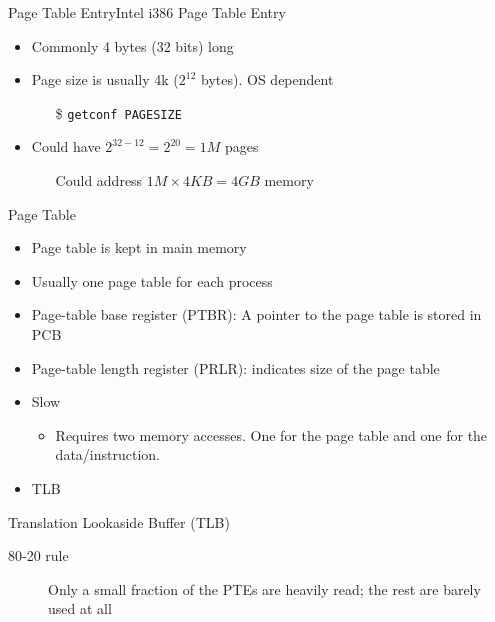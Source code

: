 \begin{frame}{Page Table Entry}{Intel i386 Page Table Entry}
  \begin{itemize}
  \item Commonly 4 bytes (32 bits) long
  \item Page size is usually 4k ($2^{12}$ bytes). OS dependent
    \begin{itemize}
    \item[\$] \texttt{getconf PAGESIZE}
    \end{itemize}
  \item Could have $2^{32-12}=2^{20}=1M$ pages
    \begin{itemize}
    \item[] Could address $1M\times{}4KB=4GB$ memory
    \end{itemize}
  \end{itemize}
  \centering
\end{frame}

\begin{frame}{Page Table}
  \begin{itemize}
  \item Page table is kept in main memory
  \item Usually one page table for each process
  \item \alert{Page-table base register (PTBR):} A pointer to the page table is stored in
    PCB
  \item \alert{Page-table length register (PRLR):} indicates size of the page table
  \item Slow
    \begin{itemize}
    \item Requires two memory accesses. One for the page table and one for the
      data/instruction.
    \end{itemize}
  \item TLB
  \end{itemize}
\end{frame}

\begin{frame}{Translation Lookaside Buffer (TLB)}
  \begin{description}
  \item[80-20 rule] Only a small fraction of the PTEs are heavily read; the rest are
    barely used at all
  \end{description}
  \centering
\end{frame}

